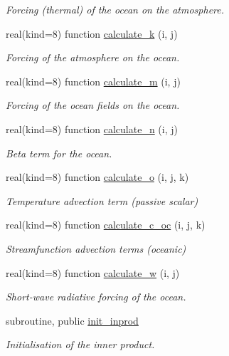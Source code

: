 \begin{DoxyCompactItemize}
\begin{DoxyCompactList}\small\item\em Forcing (thermal) of the ocean on the atmosphere. \end{DoxyCompactList}\item 
real(kind=8) function \hyperlink{namespaceinprod__analytic_a084d554f278704061269b6bdf0b85053}{calculate\+\_\+k} (i, j)
\begin{DoxyCompactList}\small\item\em Forcing of the atmosphere on the ocean. \end{DoxyCompactList}\item 
real(kind=8) function \hyperlink{namespaceinprod__analytic_a745462230d6120d9486aa7cb724322f5}{calculate\+\_\+m} (i, j)
\begin{DoxyCompactList}\small\item\em Forcing of the ocean fields on the ocean. \end{DoxyCompactList}\item 
real(kind=8) function \hyperlink{namespaceinprod__analytic_af3507292836d9e87909740e9d8a0f9bc}{calculate\+\_\+n} (i, j)
\begin{DoxyCompactList}\small\item\em Beta term for the ocean. \end{DoxyCompactList}\item 
real(kind=8) function \hyperlink{namespaceinprod__analytic_ac8f50f326a84d5b206ed4cf5c86c4301}{calculate\+\_\+o} (i, j, k)
\begin{DoxyCompactList}\small\item\em Temperature advection term (passive scalar) \end{DoxyCompactList}\item 
real(kind=8) function \hyperlink{namespaceinprod__analytic_aaa451a1ceea496bac284d4b71c06b4ee}{calculate\+\_\+c\+\_\+oc} (i, j, k)
\begin{DoxyCompactList}\small\item\em Streamfunction advection terms (oceanic) \end{DoxyCompactList}\item 
real(kind=8) function \hyperlink{namespaceinprod__analytic_a3ce2bc9a209cef35849d78e829cfbe5a}{calculate\+\_\+w} (i, j)
\begin{DoxyCompactList}\small\item\em Short-\/wave radiative forcing of the ocean. \end{DoxyCompactList}\item 
subroutine, public \hyperlink{namespaceinprod__analytic_a7491dd2b8ba26eb10d160eb0bf072e56}{init\+\_\+inprod}
\begin{DoxyCompactList}\small\item\em Initialisation of the inner product. \end{DoxyCompactList}\end{DoxyCompactItemize}
